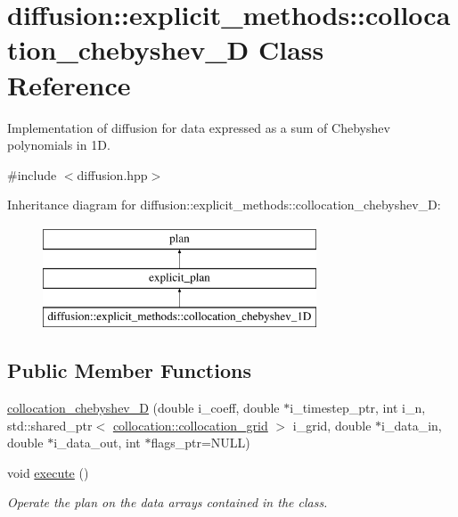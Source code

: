 \hypertarget{classdiffusion_1_1explicit__methods_1_1collocation__chebyshev__1_d}{\section{diffusion\-:\-:explicit\-\_\-methods\-:\-:collocation\-\_\-chebyshev\-\_\-D Class Reference}
\label{classdiffusion_1_1explicit__methods_1_1collocation__chebyshev__1_d}
}


Implementation of diffusion for data expressed as a sum of Chebyshev polynomials in 1\-D.  




{\ttfamily \#include $<$diffusion.\-hpp$>$}

Inheritance diagram for diffusion\-:\-:explicit\-\_\-methods\-:\-:collocation\-\_\-chebyshev\-\_\-D\-:\begin{figure}[H]
\begin{center}
\leavevmode
\includegraphics[height=3.000000cm]{classdiffusion_1_1explicit__methods_1_1collocation__chebyshev__1_d}
\end{center}
\end{figure}
\subsection*{Public Member Functions}
\begin{DoxyCompactItemize}
\item 
\hyperlink{classdiffusion_1_1explicit__methods_1_1collocation__chebyshev__1_d_ad95cf54ef1e2059b7f197da11cbabf79}{collocation\-\_\-chebyshev\-\_\-D} (double i\-\_\-coeff, double $\ast$i\-\_\-timestep\-\_\-ptr, int i\-\_\-n, std\-::shared\-\_\-ptr$<$ \hyperlink{classcollocation_1_1collocation__grid}{collocation\-::collocation\-\_\-grid} $>$ i\-\_\-grid, double $\ast$i\-\_\-data\-\_\-in, double $\ast$i\-\_\-data\-\_\-out, int $\ast$flags\-\_\-ptr=N\-U\-L\-L)
\item 
void \hyperlink{classdiffusion_1_1explicit__methods_1_1collocation__chebyshev__1_d_aeec709b2ee1d487df3b7b9f854e55047}{execute} ()
\begin{DoxyCompactList}\small\item\em Operate the plan on the data arrays contained in the class. \end{DoxyCompactList}\end{DoxyCompactItemize}
